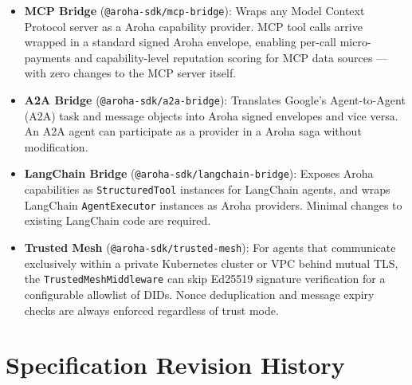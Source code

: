 \documentclass[11pt,a4paper]{article}
\begin{document}
\begin{itemize}[leftmargin=*, itemsep=4pt]
  \item \textbf{MCP Bridge} (\texttt{@aroha-sdk/mcp-bridge}): Wraps any Model Context
        Protocol server as a Aroha capability provider. MCP tool calls arrive wrapped
        in a standard signed Aroha envelope, enabling per-call micro-payments and
        capability-level reputation scoring for MCP data sources --- with zero changes
        to the MCP server itself.

  \item \textbf{A2A Bridge} (\texttt{@aroha-sdk/a2a-bridge}): Translates Google's
        Agent-to-Agent (A2A) task and message objects into Aroha signed envelopes and
        vice versa. An A2A agent can participate as a provider in a Aroha saga without
        modification.

  \item \textbf{LangChain Bridge} (\texttt{@aroha-sdk/langchain-bridge}): Exposes
        Aroha capabilities as \texttt{StructuredTool} instances for LangChain agents,
        and wraps LangChain \texttt{AgentExecutor} instances as Aroha providers. Minimal
        changes to existing LangChain code are required.

  \item \textbf{Trusted Mesh} (\texttt{@aroha-sdk/trusted-mesh}): For agents that
        communicate exclusively within a private Kubernetes cluster or VPC behind
        mutual TLS, the \texttt{TrustedMeshMiddleware} can skip Ed25519 signature
        verification for a configurable allowlist of DIDs. Nonce deduplication
        and message expiry checks are always enforced regardless of trust mode.
\end{itemize}

\section{Specification Revision History}
\end{document}
